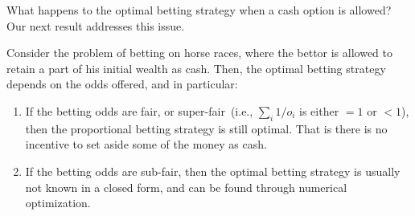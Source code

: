     What happens to the optimal betting strategy when a cash option is allowed? Our next result addresses this issue. 
    \begin{proposition}
        \label{prop:betting-with-cash-option} Consider the problem of betting on horse races, where the bettor is allowed to retain a part of his initial wealth as cash. Then, the optimal betting strategy depends on the odds offered, and in particular: 
        \begin{enumerate}[label=(\alph*)]
            \item If the betting odds are fair, or super-fair~(i.e., $\sum_{i}1/o_i$ is either $=1$ or $<1$), then the proportional betting strategy is still optimal. That is there is no incentive to set aside some of the money as cash. 
            \item If the betting odds are sub-fair, then the optimal betting strategy is usually not known in a closed form, and can be found through numerical optimization. 
        \end{enumerate}
    \end{proposition}

